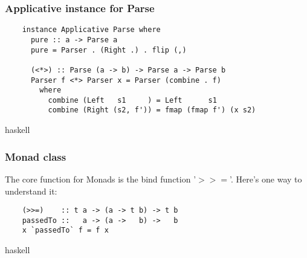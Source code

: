 \documentclass{beamer}
\begin{document}
%
%
%


\begin{frame}
  \frametitle{Applicative instance for Parse}

  \begin{verbatim}
    instance Applicative Parse where
      pure :: a -> Parse a
      pure = Parser . (Right .) . flip (,)

      (<*>) :: Parse (a -> b) -> Parse a -> Parse b
      Parser f <*> Parser x = Parser (combine . f)
        where
          combine (Left   s1     ) = Left      s1
          combine (Right (s2, f')) = fmap (fmap f') (x s2)
  \end{verbatim}{haskell}

\end{frame}


%
%
%
%
%
%



\begin{frame}

  \frametitle{Monad class}
  The core function for Monads is the bind function '\(> > =\)'. Here's one way to understand it:

  \begin{verbatim}
    (>>=)    :: t a -> (a -> t b) -> t b
    passedTo ::   a -> (a ->   b) ->   b
    x `passedTo` f = f x
  \end{verbatim}{haskell}


\end{frame}
\end{document}
